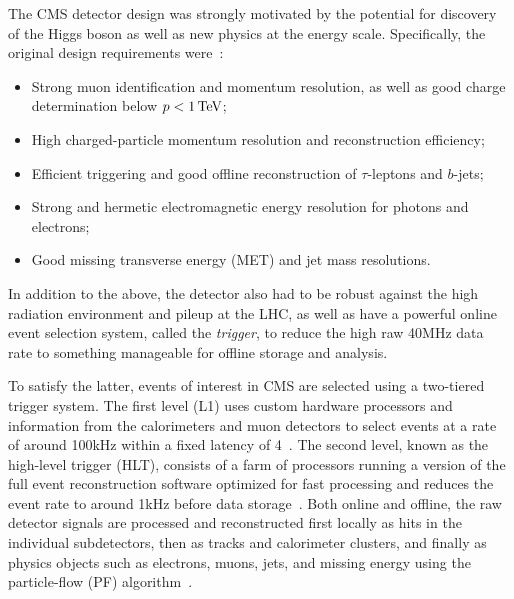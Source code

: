 
The CMS detector design was strongly motivated by the potential for discovery of the Higgs boson as well as new physics at the \TeV energy scale.
Specifically, the original design requirements were~\cite{CMS:2008xjf}:
\begin{itemize}
    \item Strong muon identification and momentum resolution, as well as good charge determination below $p < 1\,\text{Te\hspace{-.08em}V}$;
    \item High charged-particle momentum resolution and reconstruction efficiency;
    \item Efficient triggering and good offline reconstruction of $\tau$-leptons and $b$-jets;
    \item Strong and hermetic electromagnetic energy resolution for photons and electrons;
    \item Good missing transverse energy (MET) and jet mass resolutions.
\end{itemize}
In addition to the above, the detector also had to be robust against the high radiation environment and pileup at the LHC, as well as have a powerful online event selection system, called the \textit{trigger}, to reduce the high raw 40\unit{MHz} data rate to something manageable for offline storage and analysis.

To satisfy the latter, events of interest in CMS are selected using a two-tiered trigger system. 
The first level (L1) uses custom hardware processors and information from the calorimeters and muon detectors to select events at a rate of around 100\unit{kHz} within a fixed latency of 4\unit{\mus}~\cite{CMS:2020cmk}. 
The second level, known as the high-level trigger (HLT), consists of a farm of processors running a version of the full event reconstruction software optimized for fast processing and reduces the event rate to around 1\unit{kHz} before data storage~\cite{CMS:2016ngn}.
Both online and offline, the raw detector signals are processed and reconstructed first locally as hits in the individual subdetectors, then as tracks and calorimeter clusters, and finally as physics objects such as electrons, muons, jets, and missing energy using the particle-flow (PF) algorithm~\cite{CMS:2017yfk}.

